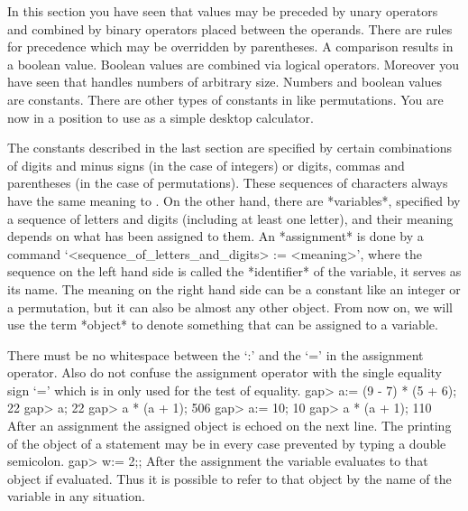 In this  section you  have  seen that values  may  be preceded  by  unary
operators  and combined by  binary operators placed between the operands.
There are rules for precedence which may be overridden by parentheses.  A
comparison  results in a boolean value.   Boolean values are combined via
logical operators.  Moreover you have seen that {\GAP} handles numbers of
arbitrary size.   Numbers and boolean   values are constants.   There are
other types of  constants in {\GAP} like permutations.   You are now in a
position to use {\GAP} as a simple desktop calculator.

\null

%
%
The  constants described  in the  last  section are  specified by certain
combinations   of digits and  minus  signs (in  the case  of integers) or
digits,  commas  and parentheses  (in   the case  of permutations). These
sequences of characters always  have the same meaning  to {\GAP}.  On the
other hand, there are *variables*, specified by a sequence of letters and
digits (including at least one letter), and their meaning depends on what
has been  assigned to them.  An *assignment* is  done by a {\GAP} command
`<sequence_of_letters_and_digits> := <meaning>',  where the  sequence  on
the left hand side is called the *identifier*  of the variable, it serves
as its name. The meaning on the right hand side can be a constant like an
integer or  a  permutation, but  it can  also be almost  any other {\GAP}
object. From now on,  we will use the  term *object* to denote  something
that can be assigned to a variable.

There must be no whitespace between the `:' and the `=' in the assignment
operator.  Also do not confuse  the  assignment operator with the  single
equality sign `=' which is in {\GAP} only used for the test of equality.
\beginexample
    gap> a:= (9 - 7) * (5 + 6);
    22
    gap> a;
    22
    gap> a * (a + 1);
    506
    gap> a:= 10;
    10
    gap> a * (a + 1);
    110 
\endexample
After an assignment the assigned object is echoed on the  next line.  The
printing of the  object of a statement may  be in every case prevented by
typing a double semicolon.
\beginexample
    gap> w:= 2;; 
\endexample
After the assignment the variable evaluates  to that object if evaluated.
Thus it is possible to  refer to that object by  the name of the variable
in any situation.

